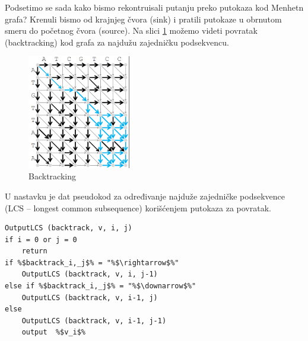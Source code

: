 Podsetimo se sada kako bismo rekontruisali putanju preko putokaza kod Menhetn grafa? Krenuli bismo od krajnjeg čvora (sink) i pratili putokaze u obrnutom smeru do početnog čvora (source). Na slici \ref{slika:backNZPS} možemo videti povratak (backtracking) kod grafa za najdužu zajedničku podsekvencu.

\begin{figure}[h!]
\centering
\includegraphics[width=0.4\textwidth]{poglavlja/5/slike/backtrackNajduzaZajPS.png}
\caption{Backtracking}
\label{slika:backNZPS}
\end{figure}

U nastavku je dat pseudokod za određivanje najduže zajedničke podsekvence (LCS – longest common subsequence) korišćenjem putokaza za povratak.

\begin{lstlisting}
OutputLCS (backtrack, v, i, j)
if i = 0 or j = 0
    return
if %$backtrack_i,_j$% = "%$\rightarrow$%"
    OutputLCS (backtrack, v, i, j-1)
else if %$backtrack_i,_j$% = "%$\downarrow$%"
    OutputLCS (backtrack, v, i-1, j)
else
    OutputLCS (backtrack, v, i-1, j-1)
    output  %$v_i$%
\end{lstlisting}



